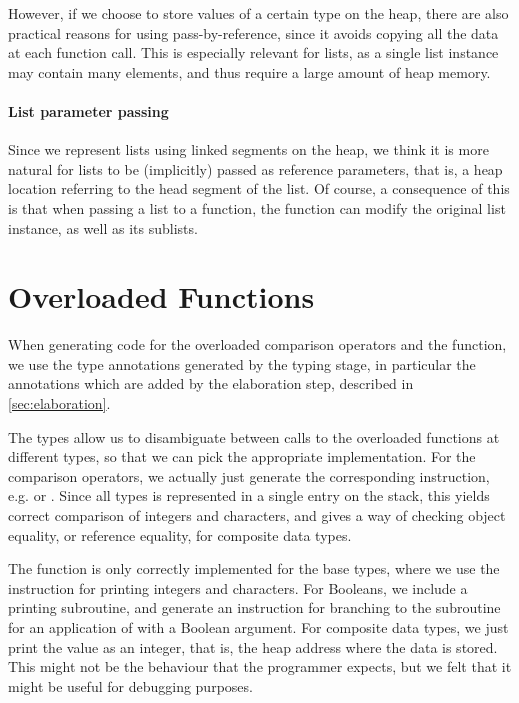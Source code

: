 However, if we choose to store values of a certain type on the heap, there are
also practical reasons for using pass-by-reference, since it avoids copying all
the data at each function call.
This is especially relevant for lists, as a single list instance may contain
many elements, and thus require a large amount of heap memory.


\paragraph{List parameter passing}
Since we represent lists using linked segments on the heap, we think it is more
natural for lists to be (implicitly) passed as reference parameters, that is, a
heap location referring to the head segment of the list.
Of course, a consequence of this is that when passing a list to a function, the
function can modify the original list instance, as well as its sublists.



\section{Overloaded Functions}

When generating code for the overloaded comparison operators and the 
function, we use the type annotations generated by the typing stage, in
particular the annotations which are added by the elaboration step, described
in \cref{sec:elaboration}.

The types allow us to disambiguate between calls to the overloaded functions
at different types, so that we can pick the appropriate implementation.
For the comparison operators, we actually just generate the corresponding
instruction, e.g.  or .
Since all types is represented in a single entry on the stack, this yields
correct comparison of integers and characters, and gives a way of checking
object equality, or reference equality, for composite data types.

The  function is only correctly implemented for the base types, where
we use the  instruction for printing integers and characters.
For Booleans, we include a printing subroutine, and generate an instruction for
branching to the subroutine for an application of  with a Boolean
argument.
For composite data types, we just print the value as an integer, that is, the
heap address where the data is stored. This might not be the behaviour that the
programmer expects, but we felt that it might be useful for debugging purposes.

